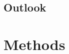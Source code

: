 \documentclass[fleqn,10pt]{wlscirep}
\newcommand{\mer}[1]{\textcolor{magenta}{#1}}
\newcommand{\draft}[1]{\textcolor{lightgray}{#1}}
\begin{document}
\draft{\lipsum[1-2]}


\subsection*{Outlook}


\draft{\lipsum[1]}

\section*{Methods}
\end{document}
